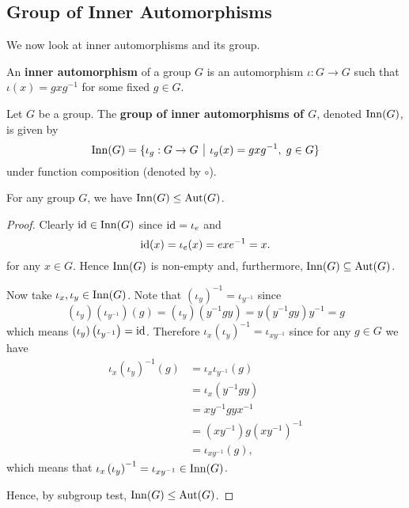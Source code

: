 \subsection{Group of Inner Automorphisms}
We now look at inner automorphisms and its group.
\begin{definition}
    An \textbf{inner automorphism} of a group $G$ is an automorphism $\iota: G \to G$ such that $\iota(x) = gxg^{-1}$ for some fixed $g \in G$.
\end{definition}
\begin{definition}
    Let $G$ be a group. The \textbf{group of inner automorphisms of $G$}, denoted $\mathrm{Inn}(G)$, is given by
    \[
        \Inn{G} = \{\iota_g: G \to G \vert \iota_g(x) = gxg^{-1},\; g \in G\}
    \]
    under function composition (denoted by $\circ$).
\end{definition}

\begin{proposition}
    For any group $G$, we have $\mathrm{Inn}(G) \leq \mathrm{Aut}(G)$.
\end{proposition}
\begin{proof}
    Clearly $\mathrm{id} \in \mathrm{Inn}(G)$ since $\mathrm{id} = \iota_e$ and
    \[
        \mathrm{id}(x) = \iota_e(x) = exe^{-1} = x.
    \]
    for any $x \in G$. Hence $\mathrm{Inn}(G)$ is non-empty and, furthermore, $\mathrm{Inn}(G) \subseteq \mathrm{Aut}(G)$.

    Now take $\iota_x, \iota_y \in \mathrm{Inn}(G)$. Note that $\left(\iota_y\right)^{-1} = \iota_{y^{-1}}$ since
    \[
        \left(\iota_y\right)\left(\iota_{y^{-1}}\right)(g) = \left(\iota_y\right)\left(y^{-1}gy\right) = y\left(y^{-1}gy\right)y^{-1} = g
    \]
    which means $\left(\iota_y\right)\left(\iota_{y^{-1}}\right) = \mathrm{id}$. Therefore $\iota_x\left(\iota_y\right)^{-1} = \iota_{xy^{-1}}$ since for any $g \in G$ we have
    \begin{align*}
        \iota_x\left(\iota_y\right)^{-1}(g) &= \iota_x\iota_{y^{-1}}(g)\\
        &= \iota_x\left(y^{-1}gy\right)\\
        &= xy^{-1}gyx^{-1}\\
        &= \left(xy^{-1}\right) g \left(xy^{-1}\right)^{-1}\\
        &= \iota_{xy^{-1}}(g),
    \end{align*}
    which means that $\iota_x\left(\iota_y\right)^{-1} = \iota_{xy^{-1}} \in \mathrm{Inn}(G)$.

    Hence, by subgroup test, $\mathrm{Inn}(G) \leq \mathrm{Aut}(G)$.
\end{proof}

